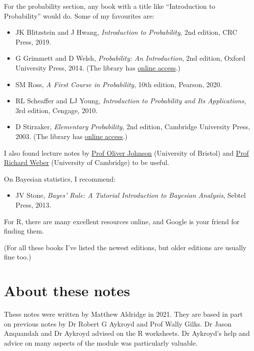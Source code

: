 \documentclass[
  a4paper,
]{book}
\providecommand{\tightlist}{%
  \setlength{\itemsep}{0pt}\setlength{\parskip}{0pt}}
\theoremstyle{definition}
\theoremstyle{definition}
\theoremstyle{definition}
\theoremstyle{definition}
\theoremstyle{remark}
\begin{document}
For the probability section, any book with a title like ``Introduction to Probability'' would do. Some of my favourites are:

\begin{itemize}
\tightlist
\item
  JK Blitzstein and J Hwang, \emph{Introduction to Probability}, 2nd edition, CRC Press, 2019.
\item
  G Grimmett and D Welsh, \emph{Probability: An Introduction}, 2nd edition, Oxford University Press, 2014. (The library has \href{https://leeds.primo.exlibrisgroup.com/permalink/44LEE_INST/13rlbcs/alma991002938669705181}{online access}.)
\item
  SM Ross, \emph{A First Course in Probability}, 10th edition, Pearson, 2020.
\item
  RL Scheaffer and LJ Young, \emph{Introduction to Probability and Its Applications}, 3rd edition, Cengage, 2010.
\item
  D Stirzaker, \emph{Elementary Probability}, 2nd edition, Cambridge University Press, 2003. (The library has \href{https://leeds.primo.exlibrisgroup.com/permalink/44LEE_INST/13rlbcs/alma991013131349705181}{online access}.)
\end{itemize}

I also found lecture notes by \href{https://people.maths.bris.ac.uk/~maotj/teaching.html}{Prof Oliver Johnson} (University of Bristol) and \href{http://www.statslab.cam.ac.uk/~rrw1/prob/index.html}{Prof Richard Weber} (University of Cambridge) to be useful.

On Bayesian statistics, I recommend:

\begin{itemize}
\tightlist
\item
  JV Stone, \emph{Bayes' Rule: A Tutorial Introduction to Bayesian Analysis}, Sebtel Press, 2013.
\end{itemize}

For R, there are many excellent resources online, and Google is your friend for finding them.

(For all these books I've listed the newest editions, but older editions are usually fine too.)

\hypertarget{about-notes}{%
\section*{About these notes}\label{about-notes}}

These notes were written by Matthew Aldridge in 2021. They are based in part on previous notes by Dr Robert G Aykroyd and Prof Wally Gilks. Dr Jason Anquandah and Dr Aykroyd advised on the R worksheets. Dr Aykroyd's help and advice on many aspects of the module was particularly valuable.
\end{document}
